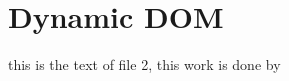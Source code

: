 %

\section{Dynamic DOM}
\label{ch:DDOM}

this is the text of file 2, this work is done by \cite{ISI:000303761300021}

%